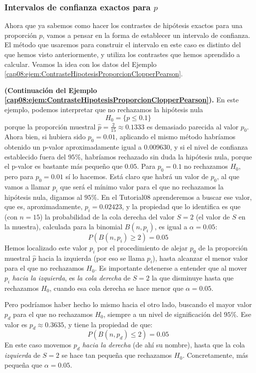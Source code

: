 \subsubsection*{Intervalos de confianza exactos para $p$}
\label{cap08:subsubsec:IntervaloConfianzaExactoPBinomial}

Ahora que ya sabemos como hacer los contrastes de hipótesis exactos para una proporción $p$, vamos a pensar en la forma de establecer un intervalo de confianza. El método que usaremos para construir el intervalo en este caso es distinto del que hemos visto anteriormente, y utiliza los contrastes que hemos aprendido a calcular. Veamos la idea con los datos del Ejemplo \ref{cap08:ejem:ContrasteHipotesisProporcionClopperPearson}.
\begin{ejemplo}{\bf (Continuación del Ejemplo \ref{cap08:ejem:ContrasteHipotesisProporcionClopperPearson}).}
\label{cap08:ejem:ContrasteHipotesisProporcionClopperPearson2}
En este ejemplo, podemos interpretar que no rechazamos la hipótesis nula
\[H_0=\{p\leq 0.1\}\]
porque la proporción muestral $\hat p=\frac{2}{15}\approx 0.1333$ es demasiado parecida al valor $p_0$. Ahora bien, si hubiera sido $p_0=0.01$, aplicando el mismo método habríamos obtenido un p-valor aproximadamente igual a $0.009630$, y si el nivel de confianza establecido fuera del $95\%$, habríamos rechazado sin duda la hipótesis nula, porque el p-valor es bastante más pequeño que $0.05$. Para $p_0=0.1$ no rechazamos $H_0$, pero para $p_0=0.01$ sí lo hacemos.  Está claro que habrá un valor de $p_0$, al que vamos a llamar $p_i$ que será el mínimo valor para el que no rechazamos la hipótesis nula, digamos al $95\%$. En el Tutorial08 aprenderemos a buscar ese valor, que es, aproximadamente, $p_i=0.02423$, y la propiedad que lo identifica es que (con $n=15$) la probabilidad de la cola derecha del valor $S=2$ (el valor de $S$ en la muestra), calculada para la binomial $B(n,p_i)$, es igual a $\alpha=0.05$:
\[P\left( B(n,p_i) \geq 2 \right)=0.05\]
Hemos localizado este valor $p_i$ por el procedimiento de alejar $p_0$ de la proporción muestral $\hat p$ hacia la izquierda (por eso se llama $p_i$), hasta alcanzar el menor valor para el que no rechazamos $H_0$. Es importante detenerse a entender que al mover $p_i$ {\em hacia la izquierda}, es {\em la cola derecha} de $S=2$ la que disminuye hasta que rechazamos $H_0$, cuando esa cola derecha se hace menor que $\alpha=0.05$.

Pero podríamos haber hecho lo mismo hacia el otro lado, buscando el mayor valor $p_d$ para el que no rechazamos $H_0$, siempre a un nivel de significación del $95\%$. Ese valor es $p_d\approx 0.3635$, y tiene la propiedad de que:
\[P\left( B(n,p_d) \leq 2 \right)=0.05\]
En este caso movemos $p_d$ {\em hacia la derecha} (de ahí su nombre), hasta que la cola {\em izquierda} de $S=2$ se hace tan pequeña que rechazamos $H_0$. Concretamente, más pequeña que $\alpha=0.05$.


\end{ejemplo}
